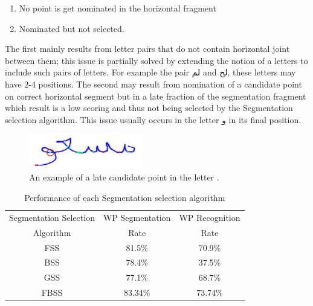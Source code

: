 \documentclass[journal,compsoc]{IEEEtran}
\begin{document}
\begin{enumerate}
\item No point is get nominated in the horizontal fragment
\item Nominated but not selected.
\end{enumerate}

The first mainly results from letter pairs that do not contain horizontal joint between them; this issue is partially solved by extending the notion of a letters to include such pairs of letters. For example the pair لم and لح, these letters may have 2-4 positions. The second may result from nomination of a candidate point on correct horizontal segment but in a late fraction of the segmentation fragment which result is a low scoring and thus not being selected by the Segmentation selection algorithm. This issue usually occurs in the letter و in its final position.

\begin{figure}[h]
\centering
\includegraphics[width=5cm]{./figures/undersegmentation_w}
\caption{An example of a late candidate point in the letter .}
\label{fig:undersegmentation_w}
\end{figure}


\begin{table}[h]
\caption{Performance of each Segmentation selection algorithm}
\begin{tabular}{ | c | c | c | }
\hline
Segmentation Selection & WP Segmentation & WP Recognition \\
Algorithm & Rate & Rate \\
\hline                 
  FSS & 81.5\% & 70.9\% \\ 
  \hline
  BSS & 78.4\% &  37.5\% \\ 
 \hline
 GSS & 77.1\% & 68.7\% \\ 
 \hline
  FBSS & 83.34\% & 73.74\% \\
\hline
\end{tabular}
\centering
\label{table:ss_algorithms_results} 
\end{table}
\end{document}
